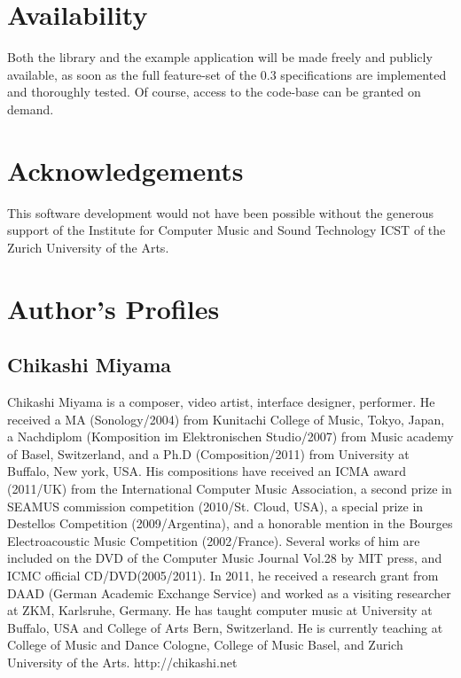 \documentclass[a4paper]{article}
\begin{document}
\section{Availability}%

Both the library and the example application will be made freely and publicly available, as soon as the full feature-set of the 0.3 specifications are implemented and thoroughly tested.
Of course, access to the code-base can be granted on demand.

\section{Acknowledgements}%

This software development would not have been possible without the generous support of the Institute for Computer Music and Sound Technology ICST of the Zurich University of the Arts.


\printbibliography


\section{Author's Profiles}
\balance %

\subsection*{Chikashi Miyama}
Chikashi Miyama is a composer, video artist, interface designer, performer. He received a MA (Sonology/2004) from Kunitachi College of Music, Tokyo, Japan, a Nachdiplom (Komposition im Elektronischen Studio/2007) from Music academy of Basel, Switzerland, and a Ph.D (Composition/2011) from University at Buffalo, New york, USA. His compositions have received an ICMA award (2011/UK) from the International Computer Music Association, a second prize in SEAMUS commission competition (2010/St. Cloud, USA), a special prize in Destellos Competition (2009/Argentina), and a honorable mention in the Bourges Electroacoustic Music Competition (2002/France). Several works of him are included on the DVD of the Computer Music Journal Vol.28 by MIT press, and ICMC official CD/DVD(2005/2011). In 2011, he received a research grant from DAAD (German Academic Exchange Service) and worked as a visiting researcher at ZKM, Karlsruhe, Germany. He has taught computer music at University at Buffalo, USA and College of Arts Bern, Switzerland. He is currently teaching at College of Music and Dance Cologne, College of Music Basel, and Zurich University of the Arts. http://chikashi.net
\end{document}
